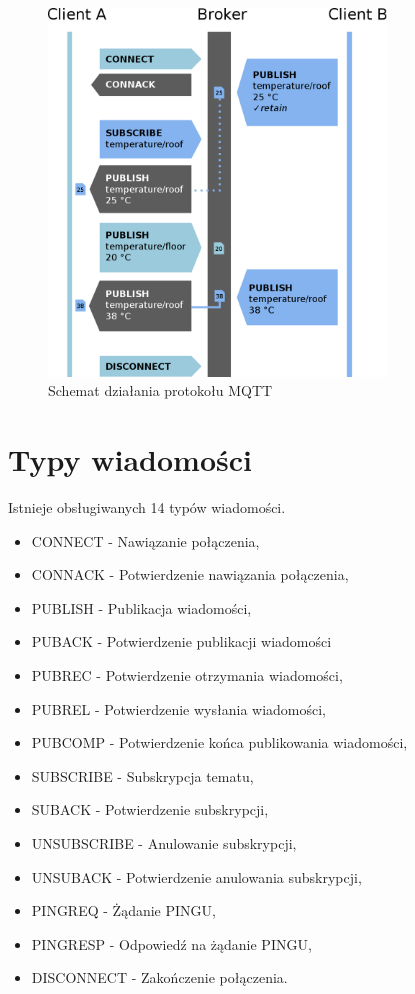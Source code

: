         \begin{figure}[ht]
            \centering
            \includegraphics[width=0.8\textwidth]{img/mqtt_schematic.png}
            \caption{Schemat działania protokołu MQTT}
            \label{fig:mqtt_schematic}
        \end{figure}
         
        
    \section{Typy wiadomości}
        Istnieje obsługiwanych 14 typów wiadomości.
        
        \begin{itemize}
            \item CONNECT - Nawiązanie połączenia,
            \item CONNACK - Potwierdzenie nawiązania połączenia,
            \item PUBLISH - Publikacja wiadomości,
            \item PUBACK - Potwierdzenie publikacji wiadomości
            \item PUBREC - Potwierdzenie otrzymania wiadomości,
            \item PUBREL - Potwierdzenie wysłania wiadomości,
            \item PUBCOMP - Potwierdzenie końca publikowania wiadomości,
            \item SUBSCRIBE - Subskrypcja tematu,
            \item SUBACK - Potwierdzenie subskrypcji,
            \item UNSUBSCRIBE - Anulowanie subskrypcji,
            \item UNSUBACK - Potwierdzenie anulowania subskrypcji,
            \item PINGREQ - Żądanie PINGU,
            \item PINGRESP - Odpowiedź na żądanie PINGU,
            \item DISCONNECT - Zakończenie połączenia.
        \end{itemize}
        
